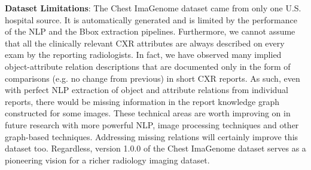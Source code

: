 
\textbf{Dataset Limitations}: The Chest ImaGenome dataset came from only one U.S. hospital source. It is automatically generated and is limited by the performance of the NLP and the Bbox extraction pipelines. Furthermore, we cannot assume that all the clinically relevant CXR attributes are always described on every exam by the reporting radiologists. In fact, we have observed many implied object-attribute relation descriptions that are documented only in the form of comparisons (e.g. no change from previous) in short CXR reports. As such, even with perfect NLP extraction of object and attribute relations from individual reports, there would be missing information in the report knowledge graph constructed for some images. These technical areas are worth improving on in future research with more powerful NLP, image processing techniques and other graph-based techniques. Addressing missing relations will certainly improve this dataset too. Regardless, version 1.0.0 of the Chest ImaGenome dataset serves as a pioneering vision for a richer radiology imaging dataset.